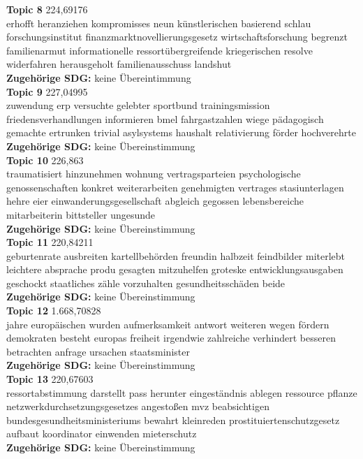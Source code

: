\documentclass[letterpaper]{article}
\begin{document}
\textbf{Topic 8} 224,69176 \\
erhofft heranziehen kompromisses neun künstlerischen basierend schlau forschungsinstitut finanzmarktnovellierungsgesetz wirtschaftsforschung begrenzt familienarmut informationelle ressortübergreifende kriegerischen resolve widerfahren herausgeholt familienausschuss landshut \\
  \textbf{Zugehörige SDG:} keine Übereintimmung \\
    
\textbf{Topic 9} 227,04995 \\
zuwendung erp versuchte gelebter sportbund trainingsmission friedensverhandlungen informieren bmel fahrgastzahlen wiege pädagogisch gemachte ertrunken trivial asylsystems haushalt relativierung förder hochverehrte \\
 \textbf{Zugehörige SDG:} keine Übereinstimmung \\

\textbf{Topic 10} 226,863 \\
traumatisiert hinzunehmen wohnung vertragsparteien psychologische genossenschaften konkret weiterarbeiten genehmigten vertrages stasiunterlagen hehre eier einwanderungsgesellschaft abgleich gegossen lebensbereiche mitarbeiterin bittsteller ungesunde   \\
      \textbf{Zugehörige SDG:} keine Übereinstimmung\\

\textbf{Topic 11} 220,84211 \\
geburtenrate ausbreiten kartellbehörden freundin halbzeit feindbilder miterlebt leichtere absprache produ gesagten mitzuhelfen groteske entwicklungsausgaben geschockt staatliches zähle vorzuhalten gesundheitsschäden beide  \\
\textbf{Zugehörige SDG:} keine Übereinstimmung \\
    
\textbf{Topic 12} 1.668,70828 \\
jahre europäischen wurden aufmerksamkeit antwort weiteren wegen fördern demokraten besteht europas freiheit irgendwie zahlreiche verhindert besseren betrachten anfrage ursachen staatsminister  \\
  \textbf{Zugehörige SDG:} keine Übereinstimmung \\
    
\textbf{Topic 13} 220,67603 \\
ressortabstimmung darstellt pass herunter eingeständnis ablegen ressource pflanze netzwerkdurchsetzungsgesetzes angestoßen mvz beabsichtigen bundesgesundheitsministeriums bewahrt kleinreden prostituiertenschutzgesetz aufbaut koordinator einwenden mieterschutz  \\
      \textbf{Zugehörige SDG:} keine Übereinstimmung \\
\end{document}
